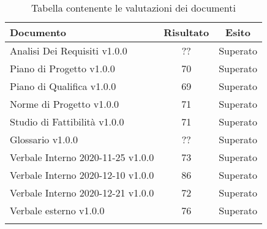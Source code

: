 \documentclass[../piano_di_qualifica.tex]{subfiles}
\begin{document}
\begin{center}
	\begin{longtable}{|l|c|c|}
		\hline
		\rowcolor{lightgray}
            \textbf{Documento} & \textbf{Risultato} &  \textbf{Esito} \\
            \hline 
            Analisi Dei Requisiti v1.0.0 & ?? & Superato \\
            \hline
            \hline 
            Piano di Progetto v1.0.0 & 70 & Superato \\
            \hline 
            Piano di Qualifica v1.0.0 & 69 & Superato \\
            \hline 
            Norme di Progetto v1.0.0 & 71 & Superato \\
            \hline 
            Studio di Fattibilità v1.0.0 & 71 & Superato \\
            \hline 
            Glossario v1.0.0 & ?? & Superato \\
            \hline 
            Verbale Interno 2020-11-25 v1.0.0 & 73 & Superato \\
            \hline 
            Verbale Interno 2020-12-10 v1.0.0 & 86 & Superato \\
            \hline 
            Verbale Interno 2020-12-21 v1.0.0 & 72 & Superato \\
            \hline 
            Verbale esterno v1.0.0 & 76 & Superato \\
            \hline
            \hline

\caption{Tabella contenente le valutazioni dei documenti}
\end{longtable}
\end{center}
\end{document}
